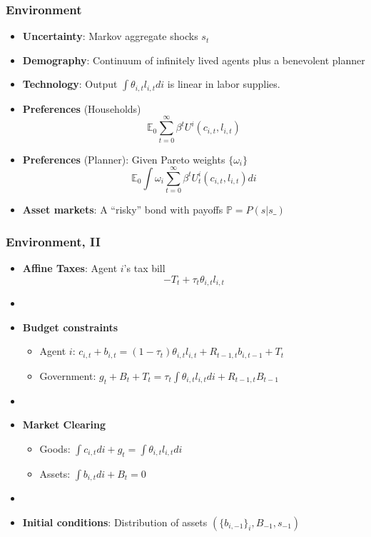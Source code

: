 \documentclass{beamer}
\begin{document}
\begin{frame}
 \frametitle{Environment}
 \begin{itemize}
 \item \textbf{Uncertainty}: Markov aggregate shocks $s_t$
  \item \textbf{Demography}: Continuum of infinitely lived agents plus a benevolent planner
  \item \textbf{Technology}: Output $\int \theta_{i,t} l_{i,t}di$ is linear in labor supplies.
  \item \textbf{Preferences }(Households)
  \begin{equation*}
\mathbb{E}_{0}\sum_{t=0}^{\infty } \beta^t U^{i}\left(
c_{i,t},l_{i,t}\right)  \label{utility lifetime}
\end{equation*}%
\item \textbf{Preferences} (Planner): Given Pareto weights $\{\omega_i\}$
\begin{equation*}
\mathbb{E}_{0}\int \omega_i\sum_{t=0}^{\infty }\beta^t U_{t}^{i}\left( c_{i,t},l_{i,t}\right)di  \label{govmt objective}
\end{equation*}
  \item \textbf{Asset markets}: A ``risky'' bond with payoffs $\mathbb{P}=P(s|s\_)$
  \end{itemize}

\end{frame}



\begin{frame}
 \frametitle{Environment, II}
 \begin{itemize}
  \item \textbf{Affine Taxes}: Agent $i$'s tax bill
\[- T_t + \tau_t \theta_{i,t}l_{i,t}\]

\item[]
  \item \textbf{Budget constraints}
  \begin{itemize}
   \item Agent $i$: $ c_{i,t}+b_{i,t}=\left( 1-\tau _{t}\right) \theta _{i,t}l_{i,t}+R_{t-1,t}b_{i,t-1}+T_{t}$
\item Government: $g_{t}+B_{t}+T_t=\tau _{t}\int \theta_{i,t}l_{i,t}di+R_{t-1,t}B_{t-1}$
  \end{itemize}

\item[]
  \item \textbf{Market Clearing}
  \begin{itemize}
   \item Goods: $\int c_{i,t}di+g_t =\int \theta _{i,t} l_{i,t}di$

   \item Assets: $\int b_{i,t}di +B_{t}=0$

  \end{itemize}
  \item[]

\item \textbf{Initial conditions}: Distribution of assets $(\{b_{i,-1}\}_i,B_{-1},s_{-1})$
\end{itemize}
\end{frame}
\end{document}
